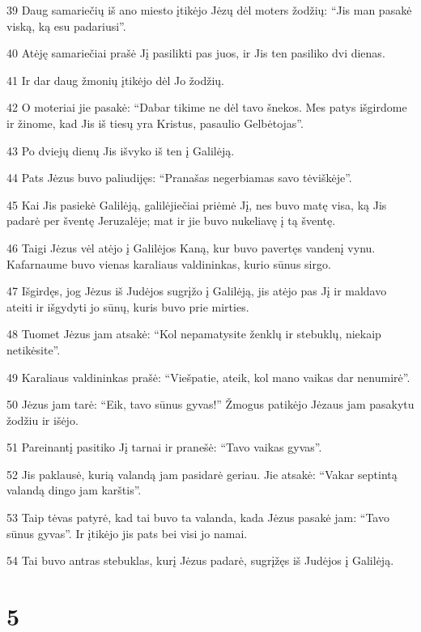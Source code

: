 \par 39 Daug samariečių iš ano miesto įtikėjo Jėzų dėl moters žodžių: “Jis man pasakė viską, ką esu padariusi”. 
\par 40 Atėję samariečiai prašė Jį pasilikti pas juos, ir Jis ten pasiliko dvi dienas. 
\par 41 Ir dar daug žmonių įtikėjo dėl Jo žodžių. 
\par 42 O moteriai jie pasakė: “Dabar tikime ne dėl tavo šnekos. Mes patys išgirdome ir žinome, kad Jis iš tiesų yra Kristus, pasaulio Gelbėtojas”. 
\par 43 Po dviejų dienų Jis išvyko iš ten į Galilėją. 
\par 44 Pats Jėzus buvo paliudijęs: “Pranašas negerbiamas savo tėviškėje”. 
\par 45 Kai Jis pasiekė Galilėją, galilėjiečiai priėmė Jį, nes buvo matę visa, ką Jis padarė per šventę Jeruzalėje; mat ir jie buvo nukeliavę į tą šventę. 
\par 46 Taigi Jėzus vėl atėjo į Galilėjos Kaną, kur buvo pavertęs vandenį vynu. Kafarnaume buvo vienas karaliaus valdininkas, kurio sūnus sirgo. 
\par 47 Išgirdęs, jog Jėzus iš Judėjos sugrįžo į Galilėją, jis atėjo pas Jį ir maldavo ateiti ir išgydyti jo sūnų, kuris buvo prie mirties. 
\par 48 Tuomet Jėzus jam atsakė: “Kol nepamatysite ženklų ir stebuklų, niekaip netikėsite”. 
\par 49 Karaliaus valdininkas prašė: “Viešpatie, ateik, kol mano vaikas dar nenumirė”. 
\par 50 Jėzus jam tarė: “Eik, tavo sūnus gyvas!” Žmogus patikėjo Jėzaus jam pasakytu žodžiu ir išėjo. 
\par 51 Pareinantį pasitiko Jį tarnai ir pranešė: “Tavo vaikas gyvas”. 
\par 52 Jis paklausė, kurią valandą jam pasidarė geriau. Jie atsakė: “Vakar septintą valandą dingo jam karštis”. 
\par 53 Taip tėvas patyrė, kad tai buvo ta valanda, kada Jėzus pasakė jam: “Tavo sūnus gyvas”. Ir įtikėjo jis pats bei visi jo namai. 
\par 54 Tai buvo antras stebuklas, kurį Jėzus padarė, sugrįžęs iš Judėjos į Galilėją.


\chapter{5}


